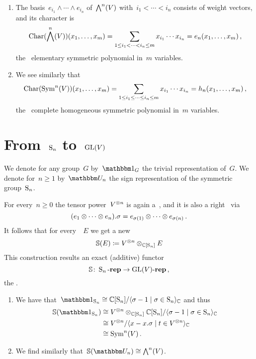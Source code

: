 \documentclass[a4paper,10pt]{scrartcl}
\begin{document}
\begin{example}
  \leavevmode
  \begin{enumerate}
    \item
      The basis~$e_{i_1} \wedge \dotsb \wedge e_{i_n}$ of~$\bigwedge^n(V)$ with~$i_1 < \dotsb < i_n$ consists of weight vectors, and its character is
      \[
        \operatorname{Char}(\bigwedge^n(V))(x_1, \dotsc, x_m)
        =
        \sum_{1 \leq i_1 < \dotsb < i_n \leq m} x_{i_1} \dotsb x_{i_n}
        =
        e_n(x_1, \dotsc, x_m) \,,
      \]
      the~{} elementary symmetric polynomial in~$m$ variables.
    \item
      We see similarly that
      \[
        \operatorname{Char}(\operatorname{Sym}^n(V))(x_1, \dotsc, x_m)
        =
        \sum_{1 \leq i_1 \leq \dotsb \leq i_n \leq m} x_{i_1} \dotsb x_{i_n}
        =
        h_n(x_1, \dotsc, x_m) \,,
      \]
      the~{} complete homogeneous symmetric polynomial in~$m$ variables.
  \end{enumerate}
\end{example}





\section{From~$\operatorname{S}_n$ to~$\operatorname{GL}(V)$}

We denote for any group~$G$ by~$\trivrep_G$ the trivial representation of~$G$.
We denote for~$n \geq 1$ by~$\signrep_n$ the sign representation of the symmetric group~$\operatorname{S}_n$.

For every~$n \geq 0$ the tensor power~$V^{\otimes n}$ is again a~{}, and it is also a right~{} via
\[
  (e_1 \otimes \dotsb \otimes e_n) . \sigma
  =
  e_{\sigma(1)} \otimes \dotsb \otimes e_{\sigma(n)} \,.
\]
It follows that for every~{}~$E$ we get a new~{}
\[
  \mathbb{S}(E)
  \coloneqq
  V^{\otimes n} \otimes_{\mathbb{C}[\operatorname{S}_n]} E
\]
This construction results an exact (additive) functor
\[
  \mathbb{S}
  \colon
  \operatorname{S}_n\text{-}\mathbf{rep}
  \to
  \operatorname{GL}(V)\text{-}\mathbf{rep} \,,
\]
the .

\begin{example}
  \leavevmode
  \begin{enumerate}
    \item
      We have that~$\trivrep_{\symm_n} \cong \Complex[\symm_n]/\gen{\sigma - 1 \suchthat \sigma \in \symm_n}_{\Complex}$ and thus
      \begin{align*}
        \Schur( \trivrep_{\symm_n} )
        &\cong
        V^{\tensor n} \tensor_{\Complex[\symm_n]} \Complex[\symm_n]/\gen{\sigma - 1 \suchthat \sigma \in \symm_n}_{\Complex}
        \\
        &\cong
        V^{\tensor n}/\gen{x - x.\sigma \suchthat t \in V^{\tensor n}}_{\Complex}
        \\
        &\cong
        \Symm^n(V) \,.
      \end{align*}
    \item
      We find similarly that~$\Schur( \signrep_n ) \cong \Exterior^n(V)$.
  \end{enumerate}
\end{example}
\end{document}
